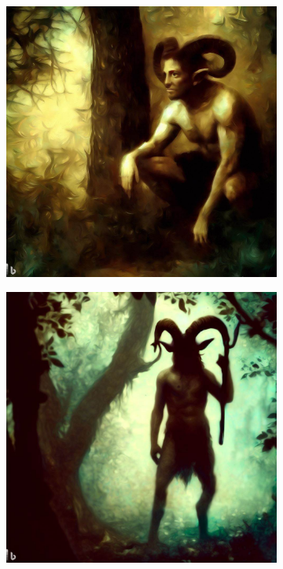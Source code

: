 \documentclass[11pt, twoside]{article}
\begin{document}
\begin{figure}[H]
\begin{subfigure}{0.3\textwidth}
    \includegraphics[width=0.99\linewidth]{faun2.jpeg}
  \end{subfigure}%
  \begin{subfigure}{0.3\textwidth}
    \centering
    \includegraphics[width=0.99\linewidth]{faun3.jpeg}
  \end{subfigure}%
\end{figure}
\end{document}
